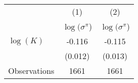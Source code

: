 \begin{tabular}{l*{2}{c}}
\hline\hline
                    &\multicolumn{1}{c}{(1)}&\multicolumn{1}{c}{(2)}\\
                    &\multicolumn{1}{c}{$\log({\sigma}^{\pi}$)}&\multicolumn{1}{c}{$\log({\sigma}^{\pi}$)}\\
\hline
$\log(K)$           &      -0.116&      -0.115\\
                    &     (0.012)&     (0.013)\\
\hline
Observations        &        1661&        1661\\
\hline\hline
\end{tabular}
